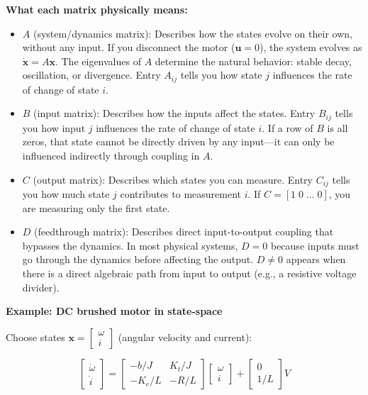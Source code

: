 \textbf{What each matrix physically means:}
\begin{itemize}
    \item $A$ (system/dynamics matrix): Describes how the states evolve on their own, without any input. If you disconnect the motor ($\mathbf{u} = 0$), the system evolves as $\dot{\mathbf{x}} = A\mathbf{x}$. The eigenvalues of $A$ determine the natural behavior: stable decay, oscillation, or divergence. Entry $A_{ij}$ tells you how state $j$ influences the rate of change of state $i$.
    \item $B$ (input matrix): Describes how the inputs affect the states. Entry $B_{ij}$ tells you how input $j$ influences the rate of change of state $i$. If a row of $B$ is all zeros, that state cannot be directly driven by any input---it can only be influenced indirectly through coupling in $A$.
    \item $C$ (output matrix): Describes which states you can measure. Entry $C_{ij}$ tells you how much state $j$ contributes to measurement $i$. If $C = [1\;0\;\ldots\;0]$, you are measuring only the first state.
    \item $D$ (feedthrough matrix): Describes direct input-to-output coupling that bypasses the dynamics. In most physical systems, $D = 0$ because inputs must go through the dynamics before affecting the output. $D \neq 0$ appears when there is a direct algebraic path from input to output (e.g., a resistive voltage divider).
\end{itemize}

\textbf{Example: DC brushed motor in state-space}

Choose states $\mathbf{x} = \begin{bmatrix} \omega \\ i \end{bmatrix}$ (angular velocity and current):

\begin{equation}
\begin{bmatrix} \dot{\omega} \\ \dot{i} \end{bmatrix} =
\begin{bmatrix} -b/J & K_t/J \\ -K_e/L & -R/L \end{bmatrix}
\begin{bmatrix} \omega \\ i \end{bmatrix} +
\begin{bmatrix} 0 \\ 1/L \end{bmatrix} V
\end{equation}


